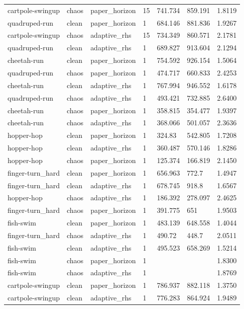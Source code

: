 \begin{tabular}{lllllll}
cartpole-swingup & chaos & paper\_horizon & 15 & 741.734 & 859.191 & 1.8119 \\
quadruped-run & clean & paper\_horizon & 1 & 684.146 & 881.836 & 1.9267 \\
cartpole-swingup & chaos & adaptive\_rhs & 15 & 734.349 & 860.571 & 2.1781 \\
quadruped-run & clean & adaptive\_rhs & 1 & 689.827 & 913.604 & 2.1294 \\
cheetah-run & clean & paper\_horizon & 1 & 754.592 & 926.154 & 1.5064 \\
quadruped-run & chaos & paper\_horizon & 1 & 474.717 & 660.833 & 2.4253 \\
cheetah-run & clean & adaptive\_rhs & 1 & 767.994 & 946.552 & 1.6178 \\
quadruped-run & chaos & adaptive\_rhs & 1 & 493.421 & 732.885 & 2.6400 \\
cheetah-run & chaos & paper\_horizon & 1 & 358.815 & 354.477 & 1.9397 \\
cheetah-run & chaos & adaptive\_rhs & 1 & 368.066 & 501.057 & 2.3636 \\
hopper-hop & clean & paper\_horizon & 1 & 324.83 & 542.805 & 1.7208 \\
hopper-hop & clean & adaptive\_rhs & 1 & 360.487 & 570.146 & 1.8286 \\
hopper-hop & chaos & paper\_horizon & 1 & 125.374 & 166.819 & 2.1450 \\
finger-turn\_hard & clean & paper\_horizon & 1 & 656.963 & 772.7 & 1.4947 \\
finger-turn\_hard & clean & adaptive\_rhs & 1 & 678.745 & 918.8 & 1.6567 \\
hopper-hop & chaos & adaptive\_rhs & 1 & 186.392 & 278.097 & 2.4625 \\
finger-turn\_hard & chaos & paper\_horizon & 1 & 391.775 & 651 & 1.9503 \\
fish-swim & clean & paper\_horizon & 1 & 483.139 & 648.558 & 1.4044 \\
finger-turn\_hard & chaos & adaptive\_rhs & 1 & 490.72 & 448.7 & 2.0511 \\
fish-swim & clean & adaptive\_rhs & 1 & 495.523 & 658.269 & 1.5214 \\
fish-swim & chaos & paper\_horizon & 1 &  &  & 1.8300 \\
fish-swim & chaos & adaptive\_rhs & 1 &  &  & 1.8769 \\
cartpole-swingup & clean & paper\_horizon & 1 & 786.937 & 882.118 & 1.3750 \\
cartpole-swingup & clean & adaptive\_rhs & 1 & 776.283 & 864.924 & 1.9489 \\

\end{tabular}
